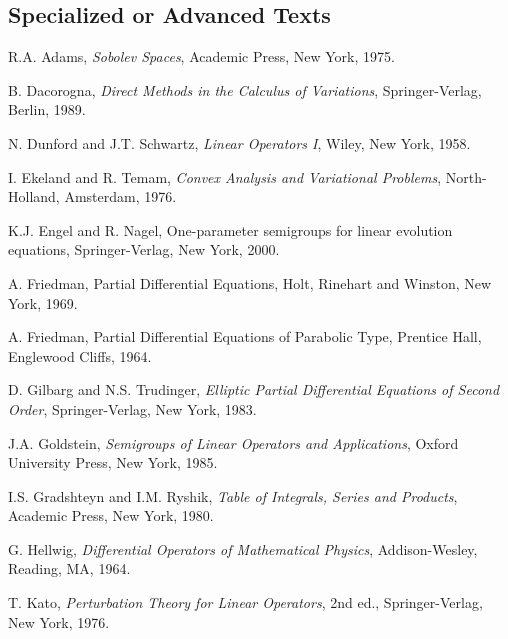 \subsection{Specialized or Advanced Texts}\label{sec:references-specialized-advanced-texts}

\begin{list}{}{\setlength{\labelwidth}{3em}\setlength{\leftmargin}{4em}\setlength{\labelsep}{.8em}}
\item[{[Adam]}] R.A. Adams, \emph{Sobolev Spaces}, Academic Press, New York, 1975.

\item[{[Dac]}] B. Dacorogna, \emph{Direct Methods in the Calculus of Variations}, Springer-Verlag, Berlin, 1989.

\item[{[DS]}] N. Dunford and J.T. Schwartz, \emph{Linear Operators I}, Wiley, New York, 1958.

\item[{[ET]}] I. Ekeland and R. Temam, \emph{Convex Analysis and Variational Problems}, North-Holland, Amsterdam, 1976.

\item[{[EN]}] K.J. Engel and R. Nagel, One-parameter semigroups for linear evolution equations, Springer-Verlag, New York, 2000.

\item[{[Fri1]}] A. Friedman, Partial Differential Equations, Holt, Rinehart and Winston, New York, 1969.

\item[{[Fri2]}] A. Friedman, Partial Differential Equations of Parabolic Type, Prentice Hall, Englewood Cliffs, 1964.

\item[{[GT]}] D. Gilbarg and N.S. Trudinger, \emph{Elliptic Partial Differential Equations of Second Order}, Springer-Verlag, New York, 1983.

\item[{[Go]}] J.A. Goldstein, \emph{Semigroups of Linear Operators and Applications}, Oxford University Press, New York, 1985.

\item[{[GR]}] I.S. Gradshteyn and I.M. Ryshik, \emph{Table of Integrals, Series and Products}, Academic Press, New York, 1980.

\item[{[He]}] G. Hellwig, \emph{Differential Operators of Mathematical Physics}, Addison-Wesley, Reading, MA, 1964.

\item[{[Ka]}] T. Kato, \emph{Perturbation Theory for Linear Operators}, 2nd ed., Springer-Verlag, New York, 1976.


\end{list}
